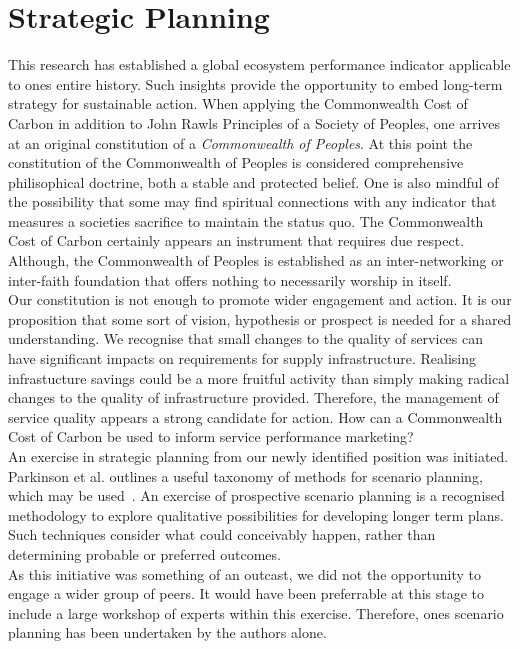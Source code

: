 \documentclass[11pt, oneside]{article}   	%
\begin{document}
\section{Strategic Planning}

This research has established a global ecosystem performance indicator applicable to ones entire history.
Such insights provide the opportunity to embed long-term strategy for sustainable action.
When applying the Commonwealth Cost of Carbon in addition to John Rawls Principles of a Society of Peoples, one arrives at an original constitution of a \emph{Commonwealth of Peoples}.
At this point the constitution of the Commonwealth of Peoples is considered comprehensive philisophical doctrine, both a stable and protected belief.
One is also mindful of the possibility that some may find spiritual connections with any indicator that measures a societies sacrifice to maintain the status quo.
The Commonwealth Cost of Carbon certainly appears an instrument that requires due respect.
Although, the Commonwealth of Peoples is established as an inter-networking or inter-faith foundation that offers nothing to necessarily worship in itself.\\

Our constitution is not enough to promote wider engagement and action.
It is our proposition that some sort of vision, hypothesis or prospect is needed for a shared understanding.
We recognise that small changes to the quality of services can have significant impacts on requirements for supply infrastructure.
Realising infrastucture savings could be a more fruitful activity than simply making radical changes to the quality of infrastructure provided.
Therefore, the management of service quality appears a strong candidate for action.
How can a Commonwealth Cost of Carbon be used to inform service performance marketing?\\

An exercise in strategic planning from our newly identified position was initiated.
Parkinson et al. outlines a useful taxonomy of methods for scenario planning, which may be used~\cite{atp1}.
An exercise of prospective scenario planning is a recognised methodology to explore qualitative possibilities for developing longer term plans.
Such techniques consider what could conceivably happen, rather than determining probable or preferred outcomes.\\

As this initiative was something of an outcast, we did not the opportunity to engage a wider group of peers.
It would have been preferrable at this stage to include a large workshop of experts within this exercise.
Therefore, ones scenario planning has been undertaken by the authors alone.\\
\end{document}
